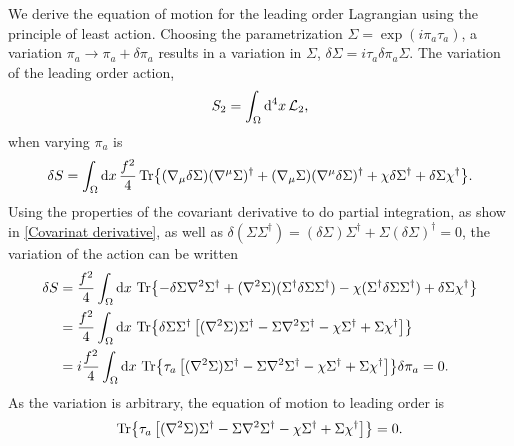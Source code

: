 We derive the equation of motion for the leading order Lagrangian using the principle of least action.
Choosing the parametrization $\Sigma = \exp(i \pi_a \tau_a)$, a variation $\pi_a \rightarrow \pi_a + \delta \pi_a$ results in a variation in $\Sigma$, $\delta \Sigma = i \tau_a \delta \pi_a \Sigma $.
The variation of the leading order action,
\begin{equation}
    S_2 = \int_\Omega \dd^4x \, \mathcal{L}_2,
\end{equation}
when varying $\pi_a$ is 
\begin{align*}
    \delta S = \int_\Omega \dd x \, \frac{f^2}{4}
    \Tr{
        (\nabla_\mu \delta \Sigma) (\nabla^\mu \Sigma)^\dagger
        + (\nabla_\mu \Sigma) (\nabla^\mu \delta \Sigma)^\dagger
        + \chi \delta \Sigma^\dagger + \delta \Sigma \chi^\dagger
    }.
\end{align*}
Using the properties of the covariant derivative to do partial integration, as show in \autoref{Covarinat derivative}, as well as $\delta(\Sigma \Sigma^\dagger) = (\delta\Sigma)\Sigma^\dagger + \Sigma (\delta \Sigma)^\dagger = 0$, the variation of the action can be written
\begin{align*}
    \delta S 
    & = \frac{f^2}{4} \int_\Omega \dd x\, 
    \Tr{
        - \delta \Sigma \nabla^2 \Sigma^\dagger
        + (\nabla^2 \Sigma) (\Sigma^\dagger \delta \Sigma \Sigma^\dagger)
        - \chi (\Sigma^\dagger \delta \Sigma \Sigma^\dagger)
        + \delta \Sigma \chi^\dagger
    } \\
    & = 
    \frac{f^2}{4} \int_\Omega \dd x\, 
    \Tr{
        \delta \Sigma \Sigma^\dagger 
        \left[
            (\nabla^2 \Sigma)\Sigma^\dagger
            - \Sigma \nabla^2 \Sigma^\dagger
            - \chi \Sigma^\dagger
            + \Sigma \chi^\dagger
        \right]
        } \\
    & = 
    i \frac{f^2}{4} \int_\Omega \dd x\, 
    \Tr{\tau_a 
    \left[
         (\nabla^2 \Sigma)\Sigma^\dagger
        - \Sigma \nabla^2 \Sigma^\dagger
        - \chi \Sigma^\dagger
        + \Sigma \chi^\dagger
    \right]
    } 
    \delta \pi_a = 0.
\end{align*}  
As the variation is arbitrary, the equation of motion to leading order is
\begin{equation}
    \Tr{
        \tau_a 
        \left[
            (\nabla^2 \Sigma)\Sigma^\dagger
            - \Sigma \nabla^2 \Sigma^\dagger
            - \chi \Sigma^\dagger
            + \Sigma \chi^\dagger
        \right]
    } = 0.
\end{equation}
